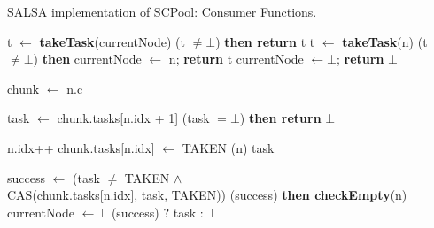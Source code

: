 \begin{algo}[!ht]
\caption{SALSA implementation of SCPool: Consumer Functions.} 
\label{alg:non-fifo}
\scriptsize
\begin{minipage}[t]{0.48\textwidth}
\begin{distribalgo}[1]
\setcounter{ALC@line}{\value{alg:non-fifo:lines}}
\smallskip


		\STATE t $\leftarrow$ {\bf takeTask}(currentNode)
		 (t $\neq \bot$) {\bf then return} t
	\ENDINDENT
  			\STATE t $\leftarrow$ {\bf takeTask}(n)
				 (t $\neq \bot$) {\bf then} currentNode $\leftarrow$ n; {\bf return} t
			\ENDINDENT
	\ENDINDENT
	\STATE currentNode $\leftarrow \bot$; {\bf return} $\bot$
\ENDINDENT

\medskip

  \STATE chunk $\leftarrow$ n.c
 
  \STATE task $\leftarrow$ chunk.tasks[n.idx + 1]
   (task $= \bot$) {\bf then return} $\bot$ 
 	
 	\smallskip 
  \STATE n.idx++  \label{alg:lines:ind-inc}
 		\STATE chunk.tasks[n.idx] $\leftarrow$ TAKEN \label{alg:lines:fast-path}
  	(n)
  	 task 
  \ENDINDENT
  
  \smallskip
 	\STATE success $\leftarrow$ (task $\neq$ TAKEN $\wedge$ \\ \label{alg:lines:stolen-chunk-begin}
 		\hspace{0.5cm} CAS(chunk.tasks[n.idx], task, TAKEN)) \label{alg:line:cas-consumer}
 	(success) {\bf then checkEmpty}(n) 
	\STATE currentNode $\leftarrow \bot$
 	 (success) ? task : $\bot$ \label{alg:lines:stolen-chunk-end}
\ENDINDENT


\end{distribalgo}
\end{minipage}
\end{algo}
